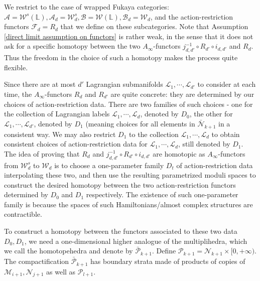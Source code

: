 \documentclass{amsart}
\numberwithin{equation}{section}
\numberwithin{figure}{section}
\begin{document}
	We restrict to the case of wrapped Fukaya categories: $\mathcal{A} = \mathcal{W}^{s}(\mathbb{L}), \mathcal{A}_{d} = \mathcal{W}^{s}_{d}, \mathcal{B} = \mathcal{W}(\mathbb{L}), \mathcal{B}_{d} = \mathcal{W}_{d}$, and the action-restriction functors $\mathcal{F}_{d} = R_{d}$ that we define on these subcategories. Note that Assumption \eqref{direct limit assumption on functors} is rather weak, in the sense that it does not ask for a specific homotopy between the two $A_{\infty}$-functors $j_{d, d'}^{-1} \circ R_{d'} \circ i_{d, d'}$ and $R_{d}$. Thus the freedom in the choice of such a homotopy makes the process quite flexible. \par
	Since there are at most $d'$ Lagrangian submanifolds $\mathcal{L}_{1}, \cdots, \mathcal{L}_{d'}$ to consider at each time, the $A_{\infty}$-functors $R_{d}$ and $R_{d'}$ are quite concrete: they are determined by our choices of action-restriction data. There are two families of such choices - one for the collection of Lagrangian labels $\mathcal{L}_{1}, \cdots, \mathcal{L}_{d}$, denoted by $D_{0}$, the other for $\mathcal{L}_{1}, \cdots, \mathcal{L}_{d'}$, denoted by $D_{1}$ (meaning choices for all elements in $\bar{\mathcal{N}}_{k+1}$ in a consistent way. We may also restrict $D_{1}$ to the collection $\mathcal{L}_{1}, \cdots, \mathcal{L}_{d}$ to obtain consistent choices of action-restriction data for $\mathcal{L}_{1}, \cdots, \mathcal{L}_{d}$, still denoted by $D_{1}$. The idea of proving that $R_{d}$ and $j_{d, d'}^{-1} \circ R_{d'} \circ i_{d, d'}$ are homotopic as $A_{\infty}$-functors from $\mathcal{W}^{s}_{d}$ to $\mathcal{W}_{d}$ is to choose a one-parameter family $D_{t}$ of action-restriction data interpolating these two, and then use the resulting parametrized moduli spaces to construct the desired homotopy between the two action-restriction functors determined by $D_{0}$ and $D_{1}$ respectively. The existence of such one-parameter family is because the spaces of such Hamiltonians/almost complex structures are contractible. \par
	To construct a homotopy between the functors associated to these two data $D_{0}, D_{1}$, we need a one-dimensional higher analogue of the multiplihedra, which we call the homotopehedra and denote by $\bar{\mathcal{P}}_{k+1}$. Define $\mathcal{P}_{k+1} = \mathcal{N}_{k+1} \times [0, +\infty)$. The compactification $\bar{\mathcal{P}}_{k+1}$ has boundary strata made of products of copies of $\mathcal{M}_{i+1}, \mathcal{N}_{j+1}$ as well as $\mathcal{P}_{l+1}$. \par
\end{document}
